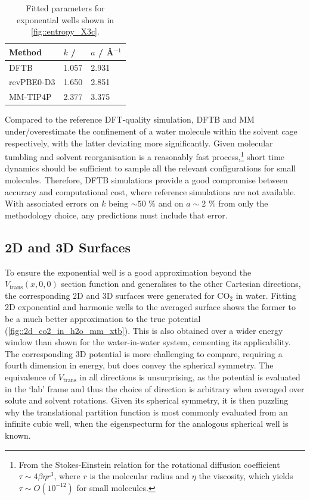 \documentclass[../main.tex]{subfiles}
\begin{document}
\begin{table}[h!]
	\renewcommand{\arraystretch}{1.5}
	\begin{center}
		\small
		\begin{tabularx}{\textwidth}{YYY} 
			\toprule
			Method & $k$ / \kcal & $a$ / \AA$^{-1}$ \\
			\hline
			DFTB             &   1.057  & 2.931 \\
			revPBE0-D3  &   1.650  & 2.851 \\
			MM-TIP4P     &   2.377 & 3.375 \\
			\bottomrule
		\end{tabularx}
	\end{center}
	\caption{Fitted parameters for exponential wells shown in \figurename{ \ref{fig::entropy_X3c}}.} 
	\label{table::figX3c_params}
\end{table}
\vspace{0.9cm}
Compared to the reference DFT-quality simulation, DFTB and MM under/overestimate the confinement of a water molecule within the solvent cage respectively, with the latter deviating more significantly. Given molecular tumbling and solvent reorganisation is a reasonably fast process,\footnote{From the Stokes-Einstein relation for the rotational diffusion coefficient $\tau \sim 4\beta\eta r^3$, where $r$ is the molecular radius and $\eta$ the viscosity, which yields $\tau \sim O(10^{-12})$ for small molecules.} short time dynamics should be sufficient to sample all the relevant configurations for small molecules. Therefore, DFTB simulations provide a good compromise between accuracy and computational cost, where reference simulations are not available. With associated errors on $k$ being $\sim 50$ \% and on $a \sim 2$ \% from only the methodology choice, any predictions must include that error.


\subsection{2D and 3D Surfaces}

To ensure the exponential well is a good approximation beyond the $V_\text{trans}(x, 0, 0)$ section function and generalises to the other Cartesian directions, the corresponding 2D and 3D surfaces were generated for CO$_2$ in water. Fitting 2D exponential and harmonic wells to the averaged surface shows the former to be a much better approximation to the true potential (\figurename \ref{fig::2d_co2_in_h2o_mm_xtb}). This is also obtained over a wider energy window than shown for the water-in-water system, cementing its applicability. The corresponding 3D potential is more challenging to compare, requiring a fourth dimension in energy, but does convey the spherical symmetry. The equivalence of $V_\text{trans}$ in all directions is unsurprising, as the potential is evaluated in the `lab' frame and thus the choice of direction is arbitrary when averaged over solute and solvent rotations. Given its spherical symmetry, it is then puzzling why the translational partition function is most commonly evaluated from an infinite cubic well, when the eigenspecturm for the analogous spherical well is known.\cite{Huang2016}
\end{document}
